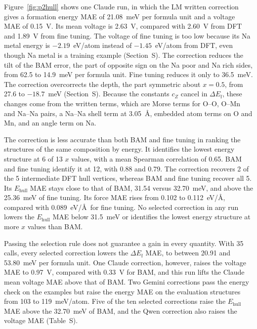 Figure~\ref{fig:p2hull} shows one Claude run, in which the LM written correction gives a formation energy MAE of 21.08~meV per formula unit and a voltage MAE of 0.15~V. Its mean voltage is 2.63~V, compared with 2.60~V from DFT and 1.89~V from fine tuning. The voltage of fine tuning is too low because its Na metal energy is $-2.19$~eV/atom instead of $-1.45$~eV/atom from DFT, even though Na metal is a training example (Section~S\fi). The correction reduces the tilt of the BAM error, the part of opposite sign on the Na poor and Na rich sides, from 62.5 to 14.9~meV per formula unit. Fine tuning reduces it only to 36.5~meV. The correction overcorrects the depth, the part symmetric about $x=0.5$, from 27.6 to $-18.7$~meV (Section~S\fi). Because the constants $c_Z$ cancel in $\Delta E_\mathrm{f}$, these changes come from the written terms, which are Morse terms for O--O, O--Mn and Na--Na pairs, a Na--Na shell term at 3.05~\AA, embedded atom terms on O and Mn, and an angle term on Na.

The correction is less accurate than both BAM and fine tuning in ranking the structures of the same composition by energy. It identifies the lowest energy structure at 6 of 13 $x$ values, with a mean Spearman correlation of 0.65. BAM and fine tuning identify it at 12, with 0.88 and 0.79. The correction recovers 2 of the 5 intermediate DFT hull vertices, whereas BAM and fine tuning recover all 5. Its $E_{\mathrm{hull}}$ MAE stays close to that of BAM, 31.54 versus 32.70~meV, and above the 25.36~meV of fine tuning. Its force MAE rises from 0.102 to 0.112~eV/\AA, compared with 0.089~eV/\AA\ for fine tuning. No selected correction in any run lowers the $E_{\mathrm{hull}}$ MAE below 31.5~meV or identifies the lowest energy structure at more $x$ values than BAM.

Passing the selection rule does not guarantee a gain in every quantity. With 35 calls, every selected correction lowers the $\Delta E_\mathrm{f}$ MAE, to between 20.91 and 53.80~meV per formula unit. One Claude correction, however, raises the voltage MAE to 0.97~V, compared with 0.33~V for BAM, and this run lifts the Claude mean voltage MAE above that of BAM. Two Gemini corrections pass the energy check on the examples but raise the energy MAE on the evaluation structures from 103 to 119~meV/atom. Five of the ten selected corrections raise the $E_{\mathrm{hull}}$ MAE above the 32.70~meV of BAM, and the Qwen correction also raises the voltage MAE (Table~S\fi).

